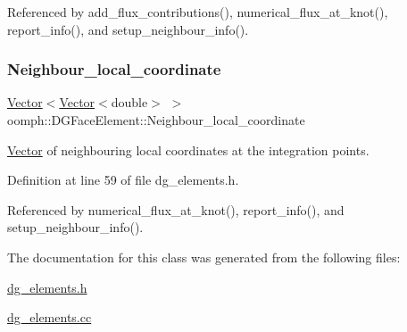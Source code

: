 Referenced by add\+\_\+flux\+\_\+contributions(), numerical\+\_\+flux\+\_\+at\+\_\+knot(), report\+\_\+info(), and setup\+\_\+neighbour\+\_\+info().

\mbox{\label{classoomph_1_1DGFaceElement_ad3fdd3f2199aa96f3d01422ac2ffe944}} 
\subsubsection{\texorpdfstring{Neighbour\+\_\+local\+\_\+coordinate}{Neighbour\_local\_coordinate}}
{\footnotesize\ttfamily \hyperlink{classoomph_1_1Vector}{Vector}$<$\hyperlink{classoomph_1_1Vector}{Vector}$<$double$>$ $>$ oomph\+::\+D\+G\+Face\+Element\+::\+Neighbour\+\_\+local\+\_\+coordinate\hspace{0.3cm}{\ttfamily [private]}}



\hyperlink{classoomph_1_1Vector}{Vector} of neighbouring local coordinates at the integration points. 



Definition at line 59 of file dg\+\_\+elements.\+h.



Referenced by numerical\+\_\+flux\+\_\+at\+\_\+knot(), report\+\_\+info(), and setup\+\_\+neighbour\+\_\+info().



The documentation for this class was generated from the following files\+:\begin{DoxyCompactItemize}
\item 
\hyperlink{dg__elements_8h}{dg\+\_\+elements.\+h}\item 
\hyperlink{dg__elements_8cc}{dg\+\_\+elements.\+cc}\end{DoxyCompactItemize}
